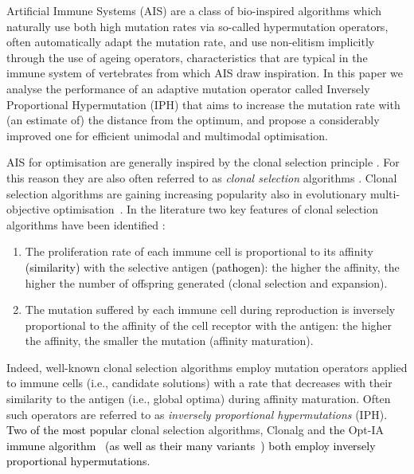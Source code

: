 \documentclass[lettersize,journal]{IEEEtran}
\newcommand{\new}[1]{\textcolor{black}{#1}}
\begin{document}
Artificial Immune Systems (AIS) are a class of bio-inspired algorithms which naturally use both high mutation rates via so-called hypermutation operators, often automatically adapt the mutation rate,  and use non-elitism implicitly through the use of ageing operators, characteristics that are typical in the immune system of vertebrates from which AIS draw inspiration. In this paper we analyse the performance of an adaptive mutation operator called Inversely Proportional Hypermutation (IPH) that aims to increase the mutation rate with (an estimate of) the distance from the optimum, and propose a considerably improved one for efficient unimodal and multimodal optimisation.

AIS for optimisation \cite{DeCastroTimmisBook,MO2020AAAI} are generally inspired by the clonal selection principle  \cite{Burnet1959}.
For this reason they are also often referred  to as {\it clonal selection} algorithms \cite{DeCastroTimmisBook}. 
Clonal selection algorithms are gaining increasing popularity also in evolutionary multi-objective optimisation~\cite{CoelloEMO2025,CoelloTEVC15,EMOReview}. 
In the literature two key features of clonal selection algorithms have been identified \cite{Brownlee2007}: 
\begin{enumerate}
	\item  The proliferation rate of each immune cell is proportional to its affinity \new{(similarity)} with the selective antigen \new{(pathogen)}: the higher the affinity, 
	the higher the number of offspring generated (clonal selection and expansion). %
	\item The mutation suffered by each immune cell during reproduction is inversely proportional to the affinity of the cell receptor with the antigen: the higher the affinity, 
	the smaller the mutation (affinity maturation).
\end{enumerate}
Indeed, well-known clonal selection algorithms employ mutation operators applied to immune cells (i.e., candidate solutions) with a rate that decreases with their similarity to the 
antigen (i.e., global optima) during affinity maturation. Often such operators are referred to as {\it inversely proportional hypermutations} (IPH). 
\new{Two of the most popular} clonal selection algorithms, Clonalg \cite{DecastroVonzuben2002}   and \new{the} Opt-IA \new{immune algorithm~\cite{CutelloNicosiaPavoneTimmis2007} (as well as their many variants~\cite{ClonalSelectionReview}) both employ inversely proportional hypermutations}.  %
\end{document}

